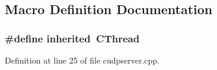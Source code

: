 \subsection{Macro Definition Documentation}
\subsubsection[{inherited}]{\setlength{\rightskip}{0pt plus 5cm}\#define inherited~C\+Thread}\label{cudpserver_8cpp_a3920e3b7cb0909b941b2409493acf8f1}


Definition at line 25 of file cudpserver.\+cpp.

